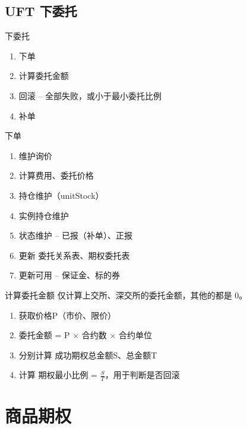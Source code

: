 \documentclass[12pt]{ctexbeamer}	%
\begin{document}

\subsection{UFT 下委托}

\begin{frame}{下委托}
  \begin{enumerate}
    \item 下单
    \item 计算委托金额
    \item 回滚 -- 全部失败，或小于最小委托比例
    \item 补单
  \end{enumerate}
\end{frame}

\begin{frame}{下单}
  \begin{enumerate}
    \item 维护询价
    \item 计算费用、委托价格
    \item 持仓维护（unitStock）
    \item 实例持仓维护
    \item 状态维护 -- 已报（补单）、正报
    \item 更新 委托关系表、期权委托表
    \item 更新可用 -- 保证金、标的券
  \end{enumerate}
\end{frame}

\begin{frame}{计算委托金额}
  仅计算上交所、深交所的委托金额，其他的都是 0。
  \begin{enumerate}
    \item 获取价格P（市价、限价）
    \item 委托金额 = P $\times$ 合约数 $\times$ 合约单位
    \item 分别计算 成功期权总金额S、总金额T
    \item 计算 期权最小比例 = $\frac{S}{T}$，用于判断是否回滚
  \end{enumerate}
\end{frame}


\section{商品期权}
\end{document}
